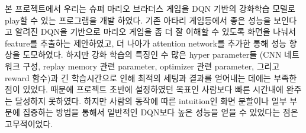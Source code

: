 %

본 프로젝트에서 우리는 슈퍼 마리오 브라더스 게임을 DQN 기반의 강화학습 모델로 play할 수 있는 프로그램을 개발 하였다.
기존 아타리 게임등에서 좋은 성능을 보인다고 알려진 DQN을 기반으로 마리오 게임을 좀 더 잘 이해할 수 있도록 화면을 나눠서 feature를 추출하는  제안하였고, 더 나아가 attention network를 추가한  통해 성능 향상을 도모하였다.
하지만 강화 학습의 특징인 수 많은 hyper parameter들 (CNN 네트워크 구성, replay memory 관련 parameter, optimizer 관련 parameter, 그리고 reward 함수)과 긴 학습시간으로 인해 최적의 세팅과 결과를 얻어내는 데에는 부족한 점이 있었다.
때문에 프로젝트 초반에 설정하였던 목표인 사람보다 빠른 시간내에 완주는 달성하지 못하였다.
하지만 사람의 동작에 따른 intuition인 화면 분할이나 일부 부분에 집중하는 방법을 통해서 일반적인 DQN보다 높은 성능을 얻을 수 있었다는 점은 고무적이었다.

